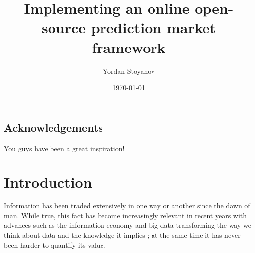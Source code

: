 \documentclass[bsc,frontabs,twoside,singlespacing,parskip,deptreport]{infthesis}     %
\begin{document}
\title{Implementing an online open-source prediction market framework}

\author{Yordan Stoyanov}



\date{\today}


\maketitle

\section*{Acknowledgements}
You guys have been a great inspiration!

\tableofcontents



\chapter{Introduction}

Information has been traded extensively in one way or another since the dawn of man. While true, this fact has become increasingly relevant in recent years with advances such as the information economy and big data transforming the way we think about data and the knowledge it implies \cite{mcgee_managing_1993}; at the same time it has never been harder to quantify its value.
\end{document}
